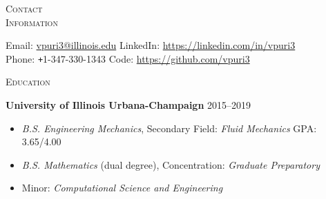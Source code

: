 \documentclass[10pt]{article}
\begin{document}
\begin{multicols}{2}
\textsc{\small Contact \\ Information}
\columnbreak

Email: \href{mailto:vpuri3@illinois.edu}{vpuri3@illinois.edu}
\hfill LinkedIn: \url{https://linkedin.com/in/vpuri3}\\
Phone: \texttt{+}1-347-330-1343                              
\hfill Code:     \url{https://github.com/vpuri3}

\end{multicols}
\vspace{-1.5em}
\begin{multicols}{2}
\textsc{\small Education}
\columnbreak

\textbf{University of Illinois Urbana-Champaign} \hfill 2015--2019

\vspace{-2.0em}
\begin{itemize}[label= ]
    \setlength\itemsep{-0.25em}
    \item {\sl B.S. Engineering Mechanics}, Secondary Field: {\sl Fluid Mechanics} \hfill GPA: 3.65/4.00
    \item {\sl B.S. Mathematics} (dual degree), Concentration: {\sl Graduate Preparatory}
    \item  Minor: {\sl Computational Science and Engineering}
\end{itemize}
\vspace{-2.0em}

\end{multicols}
\vspace{-1.5em}
\end{document}
